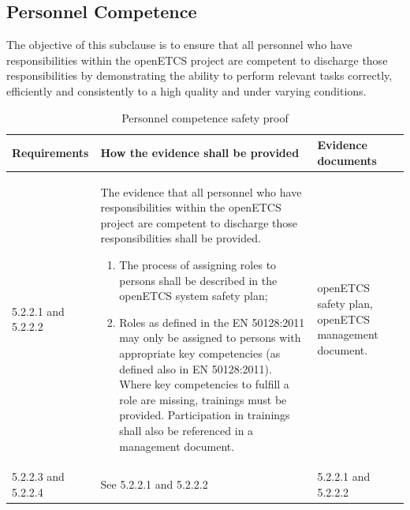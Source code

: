 \documentclass{template/openetcs_report}
\begin{document}
\subsection{Personnel Competence}
\begin{flushleft}
The objective of this subclause is to ensure that all personnel who have responsibilities within the openETCS project are competent to discharge those responsibilities by demonstrating the ability to perform relevant tasks correctly, efficiently and consistently to a high quality and under varying conditions.
\end{flushleft}
{\footnotesize\sffamily\centering
\begin{longtable}{|p{2cm}|p{9cm}|p{3cm}|}
\caption{Personnel competence safety proof}\\
\hline
\bfseries Requirements & \bfseries How the evidence shall be provided & \bfseries Evidence documents\\
\hline
\hline
\endhead
\hline
\endfoot

5.2.2.1 and 5.2.2.2 & The evidence that all personnel who have responsibilities within the openETCS project are competent to discharge those responsibilities shall be provided. 
\begin{enumerate}\itemsep=0pt
  \item The process of assigning roles to persons shall be described in the openETCS system safety plan;
  \item Roles as defined in the EN 50128:2011 may only be assigned to persons with appropriate key competencies (as defined also in EN 50128:2011). Where key competencies to fulfill a role are missing, trainings must be provided. Participation in trainings shall also be referenced in a management document.
\end{enumerate} & openETCS safety plan, openETCS management document.\\ 
\hline
5.2.2.3 and 5.2.2.4 & See 5.2.2.1 and 5.2.2.2 & 5.2.2.1 and 5.2.2.2\\ 
\hline
\end{longtable}}
\end{document}
